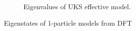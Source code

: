 \documentclass{article}
\begin{document}
\begin{figure}
\begin{subfigure}{.5\textwidth}
  \caption{Eigenvalues of UKS effective model.}
  \label{fig:sub4}
\end{subfigure}
\label{fig:test2}
\caption{Eigenstates of 1-particle models from DFT}
\end{figure}

\end{document}
